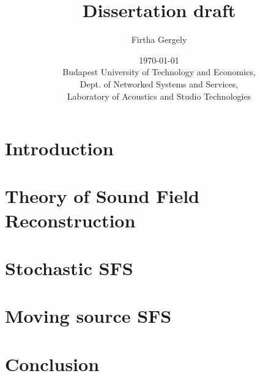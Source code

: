 \documentclass[12pt,a4paper]{report}
\title{ Dissertation draft}
\date{\today \\
Budapest University of Technology and Economics, \\ Dept. of Networked Systems and Services, \\ Laboratory of Acoustics and Studio Technologies}
\author{Firtha Gergely}
\begin{document}
\maketitle

\tableofcontents

\chapter{Introduction}

\chapter{Theory of Sound Field Reconstruction}
\label{sec:theory}


\chapter{Stochastic SFS}
\label{sec:stochastic}


\chapter{Moving source SFS}
\label{sec:moving_source}


\chapter{Conclusion}


%
\end{document}
